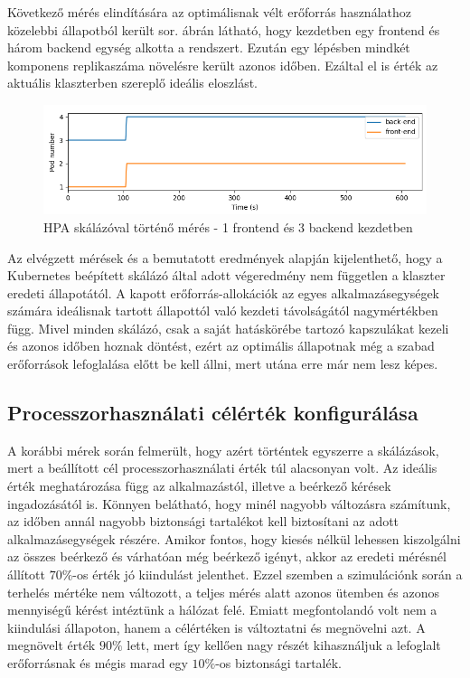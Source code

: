 Következő mérés elindítására az optimálisnak vélt erőforrás használathoz közelebbi állapotból került sor.
 ábrán látható, hogy kezdetben egy frontend és három backend egység alkotta a rendszert. 
Ezután egy lépésben mindkét komponens replikaszáma növelésre került azonos időben.
Ezáltal el is érték az aktuális klaszterben szereplő ideális eloszlást.

\begin{figure}[!ht]
	\centering
	\includegraphics[width=150mm, keepaspectratio]{figures/HPA-scaling-from-1FE-3BE_label.png}
	\caption{HPA skálázóval történő mérés - 1 frontend és 3 backend kezdetben}
	\label{fig:HPA-scaling-from-1FE-3BE}
\end{figure}

Az elvégzett mérések és a bemutatott eredmények alapján kijelenthető, hogy a Kubernetes beépített skálázó által adott végeredmény nem független a klaszter eredeti állapotától.
A kapott erőforrás-allokációk az egyes alkalmazásegységek számára ideálisnak tartott állapottól való kezdeti távolságától nagymértékben függ.
Mivel minden skálázó, csak a saját hatáskörébe tartozó kapszulákat kezeli és azonos időben hoznak döntést, ezért az optimális állapotnak még a szabad erőforrások lefoglalása előtt be kell állni, mert utána erre már nem lesz képes.


\subsection{Processzorhasználati célérték konfigurálása}
A korábbi mérek során felmerült, hogy azért történtek egyszerre a skálázások, mert a beállított cél processzorhasználati érték túl alacsonyan volt.
Az ideális érték meghatározása függ az alkalmazástól, illetve a beérkező kérések ingadozásától is.
Könnyen belátható, hogy minél nagyobb változásra számítunk, az időben annál nagyobb biztonsági tartalékot kell biztosítani az adott alkalmazásegységek részére.
Amikor fontos, hogy kiesés nélkül lehessen kiszolgálni az összes beérkező és várhatóan még beérkező igényt, akkor az eredeti mérésnél állított $70\%$-os érték jó kiindulást jelenthet.
Ezzel szemben a szimulációnk során a terhelés mértéke nem változott, a teljes mérés alatt azonos ütemben és azonos mennyiségű kérést intéztünk a hálózat felé.
Emiatt megfontolandó volt nem a kiindulási állapoton, hanem a célértéken is változtatni és megnövelni azt.
A megnövelt érték $90\%$ lett, mert így kellően nagy részét kihasználjuk a lefoglalt erőforrásnak és mégis marad egy $10\%$-os biztonsági tartalék.

